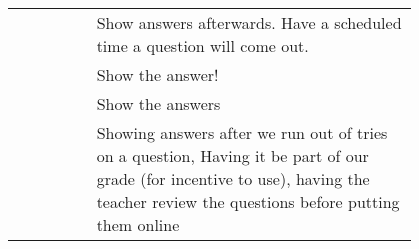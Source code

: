 {\begin{longtable}{R|p{0.8\linewidth}}
		& Show answers afterwards. Have a scheduled time a question will come out.                                                                                                                                                                                                                                                                                                                                                                                                                                                                                                                                                                                                                                                                         \\
		& Show the answer!                                                                                                                                                                                                                                                                                                                                                                                                                                                                                                                                                                                                                                                                                                                                 \\
		& Show the answers                                                                                                                                                                                                                                                                                                                                                                                                                                                                                                                                                                                                                                                                                                                                 \\
		& Showing answers after we run out of tries on a question, Having it be part of our grade (for incentive to use), having the teacher review the questions before putting them online                                                                                                                                                                                                                                                                                                                                                                                                                                                                                                                                                               \\

\end{longtable}}
